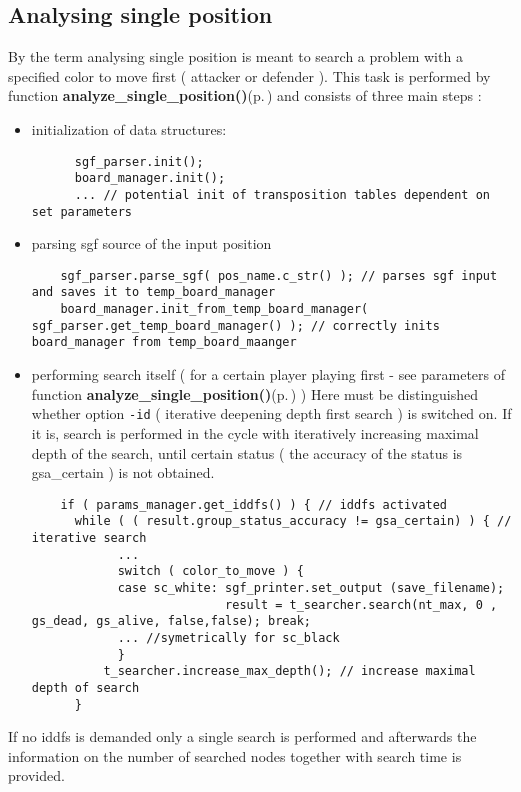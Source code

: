 \subsection{Analysing single position}\label{page_2_page_2__sec_3}
By the term analysing single position is meant to search a problem with a specified color to move first ( attacker or defender ). This task is performed by function {\bf analyze\_\-single\_\-position()}{\rm (p.\,\pageref{main_8cc_a2})} and consists of three main steps :\begin{itemize}
\item initialization of data structures: 

\footnotesize\begin{verbatim}      sgf_parser.init();
      board_manager.init();
      ... // potential init of transposition tables dependent on set parameters 
\end{verbatim}
\normalsize
\item parsing sgf source of the input position 

\footnotesize\begin{verbatim}    sgf_parser.parse_sgf( pos_name.c_str() ); // parses sgf input and saves it to temp_board_manager
    board_manager.init_from_temp_board_manager( sgf_parser.get_temp_board_manager() ); // correctly inits board_manager from temp_board_maanger
\end{verbatim}
\normalsize
\item performing search itself ( for a certain player playing first - see parameters of function {\bf analyze\_\-single\_\-position()}{\rm (p.\,\pageref{main_8cc_a2})} ) Here must be distinguished whether option {\tt -id} ( iterative deepening depth first search ) is switched on. If it is, search is performed in the cycle with iteratively increasing maximal depth of the search, until certain status ( the accuracy of the status is  gsa\_\-certain ) is not obtained.

\footnotesize\begin{verbatim}    if ( params_manager.get_iddfs() ) { // iddfs activated
      while ( ( result.group_status_accuracy != gsa_certain) ) { // iterative search 
            ...
            switch ( color_to_move ) {
            case sc_white: sgf_printer.set_output (save_filename);
                           result = t_searcher.search(nt_max, 0 , gs_dead, gs_alive, false,false); break;
            ... //symetrically for sc_black
            }
          t_searcher.increase_max_depth(); // increase maximal depth of search
      }
\end{verbatim}
\normalsize
\end{itemize}


If no iddfs is demanded only a single search is performed and afterwards the information on the number of searched nodes together with search time is provided. 